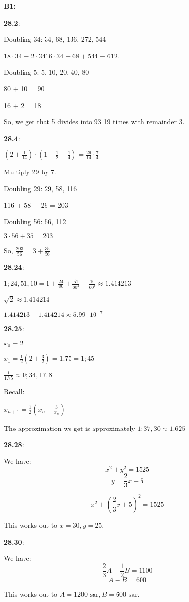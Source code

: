 \documentclass{article}
\begin{document}
\textbf{B1:}

\textbf{28.2}:

Doubling 34: 34, 68, 136, 272, 544

$18 \cdot 34 = 2 \cdot 34 16 \cdot 34 = 68 + 544 = 612$.


Doubling 5: 5, 10, 20, 40, 80

80 + 10 = 90

16 + 2 = 18

So, we get that 5 divides into 93 19 times with remainder 3.


\textbf{28.4}:

$\left(2 + \frac{1}{14}\right) \cdot \left(1 + \frac{1}{2} + \frac{1}{4}\right) = \frac{29}{14} \cdot \frac{7}{4}$

Multiply 29 by 7:

Doubling 29: 29, 58, 116

116 + 58 + 29 = 203

Doubling 56: 56, 112

$3 \cdot 56 + 35 = 203$

So, $\frac{203}{56} = 3 + \frac{35}{56}$


\textbf{28.24}:

$1;24,51,10 = 1 + \frac{24}{60} + \frac{51}{60^2} + \frac{10}{60^3} \approx 1.414213$

$\sqrt{2} \approx 1.414214$

$1.414213 - 1.414214 \approx 5.99 \cdot 10^{-7}$


\textbf{28.25}:

$x_0 = 2$

$x_1 = \frac{1}{2} \left(2 + \frac{3}{2}\right) = 1.75 = 1;45$

$\frac{1}{1.75} \approx 0;34,17,8$ 

Recall:

$x_{n+1} = \frac{1}{2} \left(x_n + \frac{3}{x_n}\right)$

The approximation we get is approximately $1;37,30 \approx 1.625$


\textbf{28.28}:

We have:
\[x^2 + y^2 = 1525\]
\[y = \frac{2}{3}x + 5\]

\[x^2 + \left(\frac{2}{3}x + 5\right)^2 = 1525\]

This works out to $x = 30, y = 25$.


\textbf{28.30}:

We have:
\[\frac{2}{3}A + \frac{1}{2}B = 1100\]
\[A - B = 600\]

This works out to $A = 1200 \text{ sar}, B = 600 \text{ sar}$.
\end{document}
